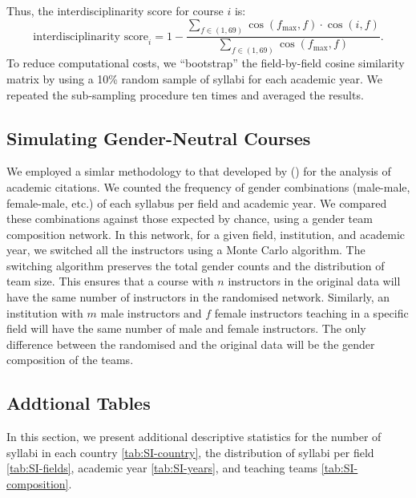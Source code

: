 \documentclass[
  british,
  11pt,
]{article}
\begin{document}
Thus, the interdisciplinarity score for course \(i\) is:
\[
  \text{interdisciplinarity score}_i = 1 - \frac{\sum_{f \in (1, 69)} \cos(f_{\max}, f) \cdot \cos(i, f)}{\sum_{f \in (1, 69)} \cos(f_{\max}, f)}. 
\]
To reduce computational costs, we ``bootstrap'' the field-by-field cosine similarity matrix by using a 10\% random sample of syllabi for each academic year. We repeated the sub-sampling procedure ten times and averaged the results.

\subsection{Simulating Gender-Neutral Courses}\label{si-simulations}

We employed a simlar methodology to that developed by () for the analysis of academic citations. We counted the frequency of gender combinations (male-male, female-male, etc.) of each syllabus per field and academic year. We compared these combinations against those expected by chance, using a gender team composition network. In this network, for a given field, institution, and academic year, we switched all the instructors using a Monte Carlo algorithm. The switching algorithm preserves the total gender counts and the distribution of team size. This ensures that a course with \(n\) instructors in the original data will have the same number of instructors in the randomised network. Similarly, an institution with \(m\) male instructors and \(f\) female instructors teaching in a specific field will have the same number of male and female instructors. The only difference between the randomised and the original data will be the gender composition of the teams.

\subsection{Addtional Tables}\label{addtional-tables}

In this section, we present additional descriptive statistics for the number of syllabi in each country \ref{tab:SI-country}, the distribution of syllabi per field \ref{tab:SI-fields}, academic year \ref{tab:SI-years}, and teaching teams \ref{tab:SI-composition}.
\end{document}

